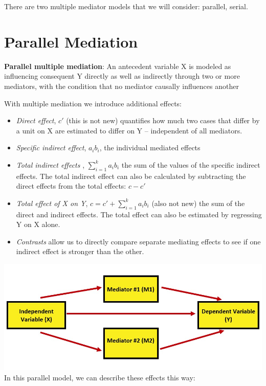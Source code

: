 \documentclass[
  english,
]{book}
\providecommand{\tightlist}{%
  \setlength{\itemsep}{0pt}\setlength{\parskip}{0pt}}
\begin{document}
There are two multiple mediator models that we will consider: parallel, serial.

\hypertarget{parallel-mediation}{%
\section{Parallel Mediation}\label{parallel-mediation}}

\textbf{Parallel multiple mediation}: An antecedent variable X is modeled as influencing consequent Y directly as well as indirectly through two or more mediators, with the condition that no mediator causally influences another \citep[p.~149]{hayes_introduction_2018}

With multiple mediation we introduce additional effects:

\begin{itemize}
\tightlist
\item
  \emph{Direct effect}, \(c'\) (this is not new) quantifies how much two cases that differ by a unit on X are estimated to differ on Y -- independent of all mediators.
\item
  \emph{Specific indirect effect}, \(a_{i}b_{i}\), the individual mediated effects
\item
  \emph{Total indirect effects }, \(\sum_{i=1}^{k}a_{i}b_{i}\) the sum of the values of the specific indirect effects. The total indirect effect can also be calculated by subtracting the direct effects from the total effects: \(c - c'\)
\item
  \emph{Total effect of X on Y}, \(c = c' + \sum_{i=1}^{k}a_{i}b_{i}\) (also not new) the sum of the direct and indirect effects. The total effect can also be estimated by regressing Y on X alone.
\item
  \emph{Contrasts} allow us to directly compare separate mediating effects to see if one indirect effect is stronger than the other.
\end{itemize}

\includegraphics{images/CompMed/ParaMed.jpg}
In this parallel model, we can describe these effects this way:
\end{document}
